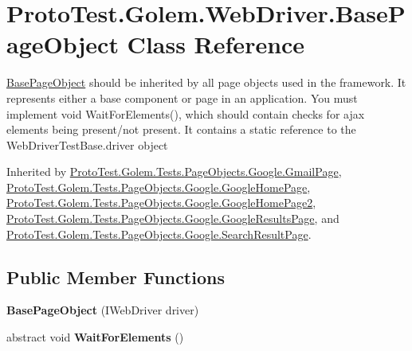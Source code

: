 \hypertarget{class_proto_test_1_1_golem_1_1_web_driver_1_1_base_page_object}{\section{Proto\-Test.\-Golem.\-Web\-Driver.\-Base\-Page\-Object Class Reference}
\label{class_proto_test_1_1_golem_1_1_web_driver_1_1_base_page_object}
}


\hyperlink{class_proto_test_1_1_golem_1_1_web_driver_1_1_base_page_object}{Base\-Page\-Object} should be inherited by all page objects used in the framework. It represents either a base component or page in an application. You must implement void Wait\-For\-Elements(), which should contain checks for ajax elements being present/not present. It contains a static reference to the Web\-Driver\-Test\-Base.\-driver object  




Inherited by \hyperlink{class_proto_test_1_1_golem_1_1_tests_1_1_page_objects_1_1_google_1_1_gmail_page}{Proto\-Test.\-Golem.\-Tests.\-Page\-Objects.\-Google.\-Gmail\-Page}, \hyperlink{class_proto_test_1_1_golem_1_1_tests_1_1_page_objects_1_1_google_1_1_google_home_page}{Proto\-Test.\-Golem.\-Tests.\-Page\-Objects.\-Google.\-Google\-Home\-Page}, \hyperlink{class_proto_test_1_1_golem_1_1_tests_1_1_page_objects_1_1_google_1_1_google_home_page2}{Proto\-Test.\-Golem.\-Tests.\-Page\-Objects.\-Google.\-Google\-Home\-Page2}, \hyperlink{class_proto_test_1_1_golem_1_1_tests_1_1_page_objects_1_1_google_1_1_google_results_page}{Proto\-Test.\-Golem.\-Tests.\-Page\-Objects.\-Google.\-Google\-Results\-Page}, and \hyperlink{class_proto_test_1_1_golem_1_1_tests_1_1_page_objects_1_1_google_1_1_search_result_page}{Proto\-Test.\-Golem.\-Tests.\-Page\-Objects.\-Google.\-Search\-Result\-Page}.

\subsection*{Public Member Functions}
\begin{DoxyCompactItemize}
\item 
\hypertarget{class_proto_test_1_1_golem_1_1_web_driver_1_1_base_page_object_a2f0ed0a75458d024da2d224d628d7436}{{\bfseries Base\-Page\-Object} (I\-Web\-Driver driver)}\label{class_proto_test_1_1_golem_1_1_web_driver_1_1_base_page_object_a2f0ed0a75458d024da2d224d628d7436}

\item 
\hypertarget{class_proto_test_1_1_golem_1_1_web_driver_1_1_base_page_object_a4642d27e0a6fdaa9ecd8b51388c31a49}{abstract void {\bfseries Wait\-For\-Elements} ()}\label{class_proto_test_1_1_golem_1_1_web_driver_1_1_base_page_object_a4642d27e0a6fdaa9ecd8b51388c31a49}

\end{DoxyCompactItemize}
